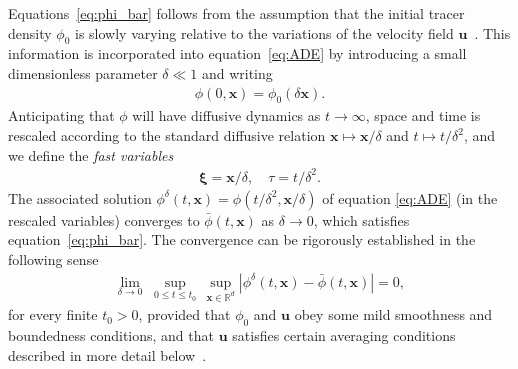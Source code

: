 \documentclass[leqno,onefignum,onetabnum]{siamltex1213}
\newcommand{\vecx}{\boldsymbol{x}}
\newcommand{\vecu}{\boldsymbol{u}}
\newcommand{\vecxi}{\boldsymbol{\xi}}
\begin{document}
Equations~\eqref{eq:phi_bar}
follows from the assumption that the
initial tracer density $\phi_0$ is 
slowly varying relative to the variations of the velocity field
$\vecu$~\cite{McLaughlin:SIAM_JAM:780,Fannjiang:1997:1033,Majda:Kramer:1999:book}.
This information is incorporated into equation~\eqref{eq:ADE} by
introducing a small dimensionless parameter $\delta\ll1$ and
writing~\cite{McLaughlin:SIAM_JAM:780,Fannjiang:1997:1033,Majda:Kramer:1999:book}      
%
\begin{align}
  \phi(0,\vecx)=\phi_0(\delta\vecx). 
\end{align}
%
Anticipating that $\phi$ will have diffusive dynamics as $t\to\infty$, space and 
time is rescaled according to the standard diffusive relation
$\vecx\mapsto\vecx/\delta$ and $t\mapsto t/\delta^2$, and we define the \emph{fast variables}
%
\begin{align}\label{eq:Fast_Vars}
  \vecxi=\vecx/\delta, \quad
  \tau= t/\delta^2.
\end{align}
%
The associated solution $\phi^\delta(t,\vecx)=\phi(t/\delta^2,\vecx/\delta)$ of equation
\eqref{eq:ADE} (in the rescaled variables) converges to
$\bar{\phi}(t,\vecx)$ as $\delta\to0$, which satisfies
equation~\eqref{eq:phi_bar}. The convergence can be rigorously
established in the following sense  
%
\begin{align}\label{eq:Homogenization_Theorem}
  \lim_{\delta\to0}\;\sup_{0\leq t\leq t_0}\,\sup_{\vecx\in\mathbb{R}^d}
  |\phi^\delta(t,\vecx)-\bar{\phi}(t,\vecx)| =0,
\end{align}
%
for every finite $t_0>0$, provided that $\phi_0$ and $\vecu$ obey some
mild smoothness and boundedness
conditions, and that $\vecu$ satisfies certain averaging conditions
described in more detail below~\cite{Majda:Kramer:1999:book}.
\end{document}
